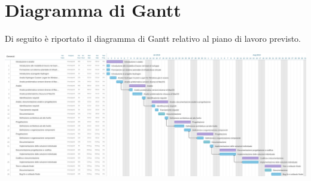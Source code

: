 \section*{Diagramma di Gantt}
Di seguito è riportato il diagramma di Gantt relativo al piano di lavoro previsto.
\begin{center}
	\includegraphics[width=18cm]{img/gantt.jpeg}
\end{center}